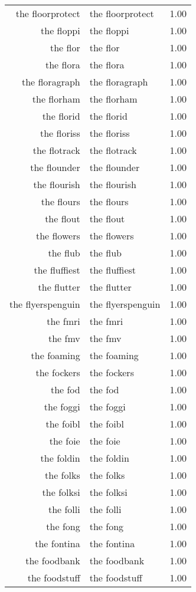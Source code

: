 \begin{table}[ht]
\begin{tabular}{rlr}
  the floorprotect & the floorprotect & 1.00 \\ 
  the floppi & the floppi & 1.00 \\ 
  the flor & the flor & 1.00 \\ 
  the flora & the flora & 1.00 \\ 
  the floragraph & the floragraph & 1.00 \\ 
  the florham & the florham & 1.00 \\ 
  the florid & the florid & 1.00 \\ 
  the floriss & the floriss & 1.00 \\ 
  the flotrack & the flotrack & 1.00 \\ 
  the flounder & the flounder & 1.00 \\ 
  the flourish & the flourish & 1.00 \\ 
  the flours & the flours & 1.00 \\ 
  the flout & the flout & 1.00 \\ 
  the flowers & the flowers & 1.00 \\ 
  the flub & the flub & 1.00 \\ 
  the fluffiest & the fluffiest & 1.00 \\ 
  the flutter & the flutter & 1.00 \\ 
  the flyerspenguin & the flyerspenguin & 1.00 \\ 
  the fmri & the fmri & 1.00 \\ 
  the fmv & the fmv & 1.00 \\ 
  the foaming & the foaming & 1.00 \\ 
  the fockers & the fockers & 1.00 \\ 
  the fod & the fod & 1.00 \\ 
  the foggi & the foggi & 1.00 \\ 
  the foibl & the foibl & 1.00 \\ 
  the foie & the foie & 1.00 \\ 
  the foldin & the foldin & 1.00 \\ 
  the folks & the folks & 1.00 \\ 
  the folksi & the folksi & 1.00 \\ 
  the folli & the folli & 1.00 \\ 
  the fong & the fong & 1.00 \\ 
  the fontina & the fontina & 1.00 \\ 
  the foodbank & the foodbank & 1.00 \\ 
  the foodstuff & the foodstuff & 1.00 \\ 

\end{tabular}
\end{table}
